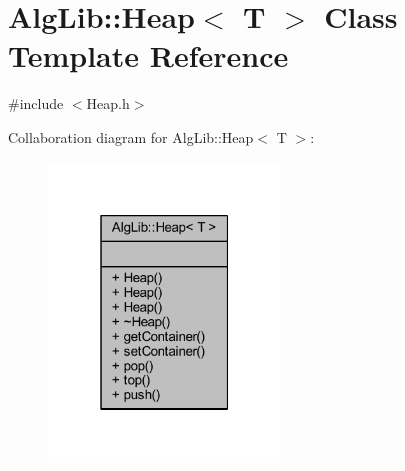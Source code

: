 \hypertarget{class_alg_lib_1_1_heap}{}\section{Alg\+Lib\+:\+:Heap$<$ T $>$ Class Template Reference}
\label{class_alg_lib_1_1_heap}


{\ttfamily \#include $<$Heap.\+h$>$}



Collaboration diagram for Alg\+Lib\+:\+:Heap$<$ T $>$\+:\nopagebreak
\begin{figure}[H]
\begin{center}
\leavevmode
\includegraphics[width=175pt]{class_alg_lib_1_1_heap__coll__graph}
\end{center}
\end{figure}
